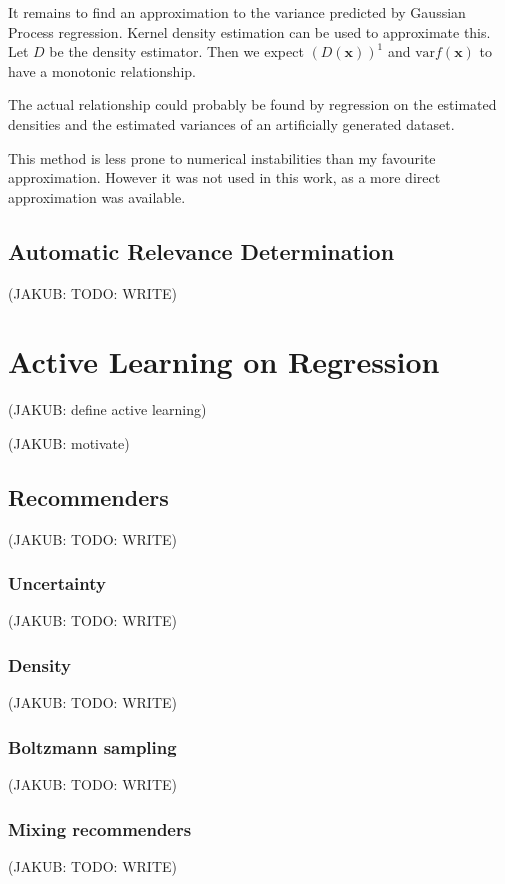 \documentclass[11pt,twoside]{report}
\newcommand\bx{\mathbf{x}}
\newcommand\var{\mathrm{var}}
\newcommand\jakub[1]{{\color{red}(JAKUB: #1)}}
\begin{document}
It remains to find an approximation to the variance predicted by Gaussian Process regression. Kernel density estimation can be used to approximate this. Let $D$ be the density estimator. Then we expect $\left(D(\bx)\right)^1$ and $\var f(\bx)$ to have a monotonic relationship.

The actual relationship could probably be found by regression on the estimated densities and the estimated variances of an artificially generated dataset.

This method is less prone to numerical instabilities than my favourite approximation. However it was not used in this work, as a more direct approximation was available.

\section{Automatic Relevance Determination}

\jakub{TODO: WRITE}

\chapter{Active Learning on Regression}

\jakub{define active learning}

\jakub{motivate}

\section{Recommenders}

\jakub{TODO: WRITE}

\subsection{Uncertainty}

\jakub{TODO: WRITE}

\subsection{Density}

\jakub{TODO: WRITE}

\subsection{Boltzmann sampling}

\jakub{TODO: WRITE}

\subsection{Mixing recommenders}

\jakub{TODO: WRITE}
\end{document}
